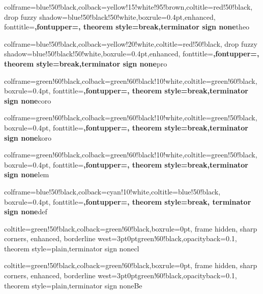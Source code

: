 \usepackage{tcolorbox}

%  
{colframe=blue!50!black,colback=yellow!15!white!95!brown,coltitle=red!50!black,
drop fuzzy shadow=blue!50!black!50!white,boxrule=0.4pt,enhanced,
fonttitle=\upshape\bfseries,fontupper=\upshape,
theorem style=break,terminator sign none}{theo}

%
{colframe=blue!50!black,colback=yellow!20!white,coltitle=red!50!black,
drop fuzzy shadow=blue!50!black!50!white,boxrule=0.4pt,enhanced,
fonttitle=\upshape\bfseries,fontupper=\upshape,
theorem style=break,terminator sign none}{pro}

%
{colframe=green!60!black,colback=green!60!black!10!white,coltitle=green!60!black,
boxrule=0.4pt,
fonttitle=\upshape\bfseries,fontupper=\upshape,
theorem style=break,terminator sign none}{coro}

%
{colframe=green!60!black,colback=green!60!black!10!white,coltitle=green!50!black,
boxrule=0.4pt,
fonttitle=\upshape\bfseries,fontupper=\upshape,
theorem style=break,terminator sign none}{koro}

%
{colframe=green!60!black,colback=green!60!black!10!white,coltitle=green!50!black,
boxrule=0.4pt,
fonttitle=\upshape\bfseries,fontupper=\upshape,
theorem style=break,terminator sign none}{lem}

%
{colframe=blue!50!black,colback=cyan!10!white,coltitle=blue!50!black,
boxrule=0.4pt,
fonttitle=\upshape\bfseries,fontupper=\upshape,
theorem style=break, terminator sign none}{def}

%
{coltitle=green!50!black,colback=green!60!black,boxrule=0pt,
frame hidden, sharp corners, enhanced,
borderline west={3pt}{0pt}{green!60!black},opacityback=0.1,
theorem style=plain,terminator sign none}{cl}

%
{coltitle=green!50!black,colback=green!60!black,boxrule=0pt,
frame hidden, sharp corners, enhanced,
borderline west={3pt}{0pt}{green!60!black},opacityback=0.1,
theorem style=plain,terminator sign none}{Be}

